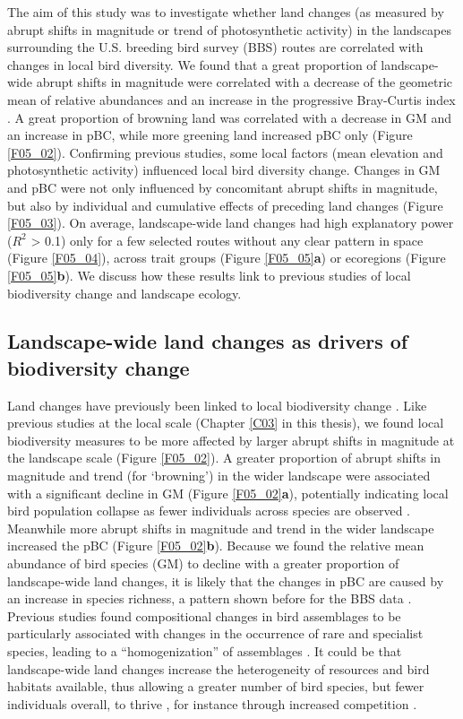 The aim of this study was to investigate whether land changes (as measured by abrupt shifts in magnitude or trend of photosynthetic activity) in the landscapes surrounding the U.S. breeding bird survey (BBS) routes are correlated with changes in local bird diversity. We found that a great proportion of landscape-wide abrupt shifts in magnitude were correlated with a decrease of the geometric mean of relative abundances \citep[GM, ][]{Buckland2011} and an increase in the progressive Bray-Curtis index \citep[pBC, ][]{Rittenhouse2010}. A great proportion of browning land was correlated with a decrease in GM and an increase in pBC, while more greening land increased pBC only (Figure \ref{F05_02}). Confirming previous studies, some local factors (\eg mean elevation and photosynthetic activity) influenced local bird diversity change. Changes in GM and pBC were not only influenced by concomitant abrupt shifts in magnitude, but also by individual and cumulative effects of preceding land changes (Figure \ref{F05_03}). On average, landscape-wide land changes had high explanatory power ($R^2$ > 0.1) only for a few selected routes without any clear pattern in space (Figure \ref{F05_04}), across trait groups (Figure \ref{F05_05}\textbf{a}) or ecoregions (Figure \ref{F05_05}\textbf{b}).  We discuss how these results link to previous studies of local biodiversity change and landscape ecology. 

\subsection{Landscape-wide land changes as drivers of biodiversity change}
\label{C05_0401}

Land changes have previously been linked to local biodiversity change \citep{Brooks2002,Ewers2013,Cousins2015}. Like previous studies at the local scale (Chapter \ref{C03} in this thesis), we found local biodiversity measures to be more affected by larger abrupt shifts in magnitude at the landscape scale (Figure \ref{F05_02}). A greater proportion of abrupt shifts in magnitude and trend (for ‘browning’) in the wider landscape were associated with a significant decline in GM (Figure \ref{F05_02}\textbf{a}), potentially indicating local bird population collapse as fewer individuals across species are observed \citep{Loh2005,Buckland2011}. Meanwhile more abrupt shifts in magnitude and trend in the wider landscape increased the pBC (Figure \ref{F05_02}\textbf{b}). Because we found the relative mean abundance of bird species (GM) to decline with a greater proportion of landscape-wide land changes, it is likely that the changes in pBC are caused by an increase in species richness, a pattern shown before for the BBS data \citep{Schipper2016}. Previous studies found compositional changes in bird assemblages to be particularly associated with changes in the occurrence of rare and specialist species, leading to a “homogenization” of assemblages \citep{McKinney1999,Olden2006a,Newbold2018}. It could be that landscape-wide land changes increase the heterogeneity of resources and bird habitats available, thus allowing a greater number of bird species, but fewer individuals overall, to   thrive \citep{Holt2009,Stein2014}, for instance through increased competition \citep{RandallHughes2007}. 


